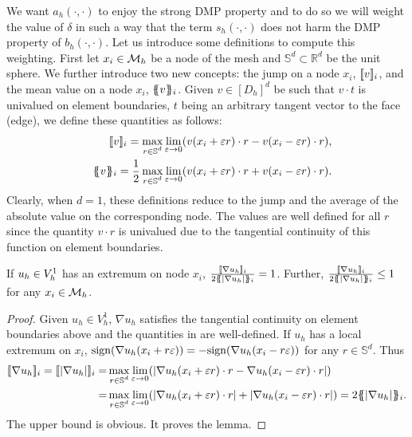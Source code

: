 We want $a_h(\cdot,\cdot)$ to enjoy the strong DMP property and to do so we will  weight the value of $\delta$ in such a way that the term $s_h(\cdot,\cdot)$ does not harm the DMP property of $b_h(\cdot,\cdot)$. Let us introduce some definitions to compute this weighting. First let $x_i\in \mathcal{M}_h$ be a node of the mesh and $\mathbb{S}^d\subset \mathbb{R}^d$ be the unit sphere. We further introduce two new concepts: the jump on a node $x_i$, $\lbrack\!\lbrack v \rbrack\!\rbrack_i$, and the mean value on a node $x_i$, $\{\! \!\{ v\}\! \!\}_i$. Given $v\in [D_h]^d$ be such that $v \cdot t$ is univalued on element boundaries, $t$ being an arbitrary tangent vector to the face (edge), we define these quantities as follows:
\begin{align}\label{eq-njump}
\lbrack\!\lbrack v \rbrack\!\rbrack_i = \max_{\substack{ r\in\mathbb{S}^d }} \lim_{\varepsilon \rightarrow 0} (v(x_i+\varepsilon r)\cdot r - v(x_i-\varepsilon r)\cdot r),\\  
\quad \{\! \!\{ v\}\! \!\}_i = \frac{1}{2} \max_{\substack{ r\in\mathbb{S}^d }} \lim_{\varepsilon \rightarrow 0} (v(x_i+\varepsilon r)\cdot r + v(x_i-\varepsilon r)\cdot r).
\end{align}
Clearly, when $d=1$, these definitions reduce to the jump and the average of the absolute value on the corresponding node. The values are well defined for all $r$ %
since the quantity $v \cdot r$ is univalued due to the tangential continuity of this function on element boundaries.  

\begin{lemma}\label{lem-extrema}
 If $u_h\in V_h^1$ has an extremum on node $x_i$, $ \frac{\lbrack\!\lbrack \nabla u_h \rbrack\!\rbrack_i} { 2\{\! \!\{ |\nabla u_h|\}\! \!\}_i} = 1$. Further,  $ \frac{\lbrack\!\lbrack \nabla u_h \rbrack\!\rbrack_i} { 2\{\! \!\{ |\nabla u_h|\}\! \!\}_i} \leq 1$ for any $x_i \in \mathcal{M}_h$.
\end{lemma}
\begin{proof}
Given $u_h \in V_h^1$, $\nabla u_h$ satisfies the tangential continuity on element boundaries above and the quantities in  are well-defined. If $u_h$ has a local extremum on $x_i$, ${\rm sign} (\nabla u_h(x_i+r\varepsilon)) = -{\rm sign} (\nabla u_h(x_i-r\varepsilon))$ for any $ r\in \mathbb{S}^d$. Thus
\begin{align*}
\jump{\nabla u_h}_i = \jump{|\nabla u_h|}_i = & \max_{\substack{ r\in\mathbb{S}^d }} \lim_{\varepsilon \rightarrow 0} (|\nabla u_h(x_i+\varepsilon r)\cdot r - \nabla u_h(x_i-\varepsilon r)\cdot r|) \\
= &\max_{\substack{ r\in\mathbb{S}^d }} \lim_{\varepsilon \rightarrow 0} (|\nabla u_h(x_i+\varepsilon r)\cdot r | + |\nabla u_h(x_i-\varepsilon r)\cdot r|) =
2 \mean{|\nabla u_h|}_i.
\end{align*}
The upper bound is obvious. It proves the lemma.
\end{proof}

